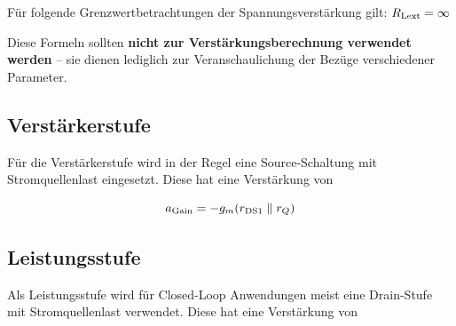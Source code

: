 Für folgende Grenzwertbetrachtungen der Spannungsverstärkung gilt: $R_{\rm Lext} = \infty$

\smallskip


\medskip

Diese Formeln sollten \textbf{nicht zur Verstärkungsberechnung verwendet werden} -- sie dienen lediglich zur Veranschaulichung der Bezüge verschiedener Parameter.


\subsection{Verstärkerstufe}
Für die Verstärkerstufe wird in der Regel eine Source-Schaltung mit Stromquellenlast eingesetzt.
Diese hat eine Verstärkung von

\vspace{-0.2cm}
\[
    a_{\rm Gain} = - g_m (r_{\rm DS1} \parallel r_Q)
\]


\subsection{Leistungsstufe}
Als Leistungsstufe wird für Closed-Loop Anwendungen meist eine Drain-Stufe mit Stromquellenlast verwendet.
Diese hat eine Verstärkung von
\vspace{-0.2cm}

